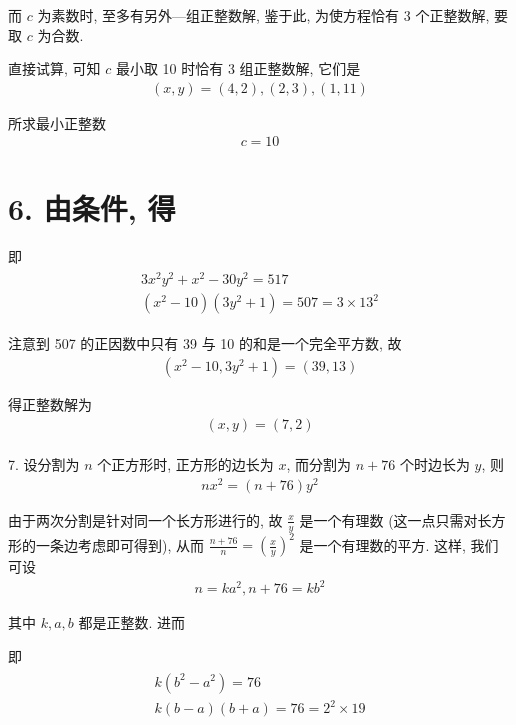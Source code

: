 而 $c$ 为素数时, 至多有另外—组正整数解, 鉴于此, 为使方程恰有 3 个正整数解, 要取 $c$ 为合数.

直接试算, 可知 $c$ 最小取 10 时恰有 3 组正整数解, 它们是
\begin{align*}
	(x, y)=(4,2),(2,3),(1,11)
\end{align*}

所求最小正整数
\begin{align*}
	c=10
\end{align*}

\section{6. 由条件, 得}
即
\begin{align*}
	\begin{gathered}
		3 x^{2} y^{2}+x^{2}-30 y^{2}=517 \\
		\left(x^{2}-10\right)\left(3 y^{2}+1\right)=507=3 \times 13^{2}
	\end{gathered}
\end{align*}

注意到 507 的正因数中只有 39 与 10 的和是一个完全平方数, 故
\begin{align*}
	\left(x^{2}-10,3 y^{2}+1\right)=(39,13)
\end{align*}

得正整数解为
\begin{align*}
	(x, y)=(7,2)
\end{align*}\\
7. 设分割为 $n$ 个正方形时, 正方形的边长为 $x$, 而分割为 $n+76$ 个时边长为 $y$, 则
\begin{align*}
	n x^{2}=(n+76) y^{2}
\end{align*}

由于两次分割是针对同一个长方形进行的, 故 $\frac{x}{y}$ 是一个有理数 (这一点只需对长方形的一条边考虑即可得到), 从而 $\frac{n+76}{n}=\left(\frac{x}{y}\right)^{2}$ 是一个有理数的平方. 这样, 我们可设
\begin{align*}
	n=k a^{2}, n+76=k b^{2}
\end{align*}

其中 $k ,  a ,  b$ 都是正整数. 进而

即
\begin{align*}
	\begin{gathered}
		k\left(b^{2}-a^{2}\right)=76 \\
		k(b-a)(b+a)=76=2^{2} \times 19
	\end{gathered}
\end{align*}

